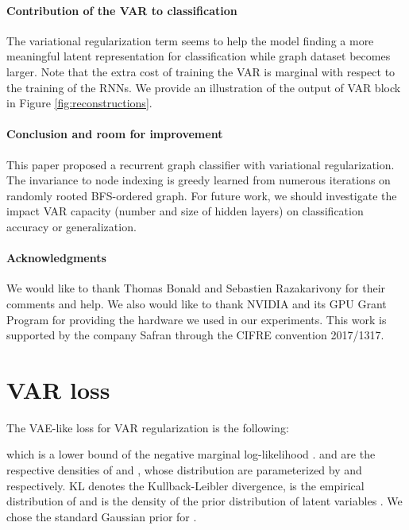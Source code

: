 \documentclass{article} \usepackage{iclr2019_conference}
\begin{document}
\paragraph{Contribution of the VAR to classification}
The variational regularization term seems to help the model finding a more meaningful latent representation for classification while graph dataset becomes larger. Note that the extra cost of training the VAR is marginal with respect to the training of the RNNs. We provide an illustration of the output of VAR block in Figure \ref{fig:reconstructions}.

\paragraph{Conclusion and room for improvement}
This paper proposed a recurrent graph classifier with variational regularization. The invariance to node indexing is greedy learned from numerous iterations on randomly rooted BFS-ordered graph. For future work, we should investigate the impact VAR capacity (number and size of hidden layers) on classification accuracy or generalization.


\paragraph{Acknowledgments} We would like to thank Thomas Bonald and Sebastien Razakarivony for their comments and help. We also would like to thank NVIDIA and its GPU Grant Program for providing the hardware we used in our experiments. This work is supported by the company Safran through the CIFRE convention 2017/1317. 






\clearpage
\appendix


\section{VAR loss}
\label{app:elbo}

The VAE-like loss for VAR regularization is the following:



which is a lower bound of the negative marginal log-likelihood .  and  are the respective densities of  and , whose distribution are parameterized by  and  respectively. KL denotes the Kullback-Leibler divergence,  is the empirical distribution of  and  is the density of the prior distribution of latent variables . We chose the standard Gaussian prior for . 
\end{document}
